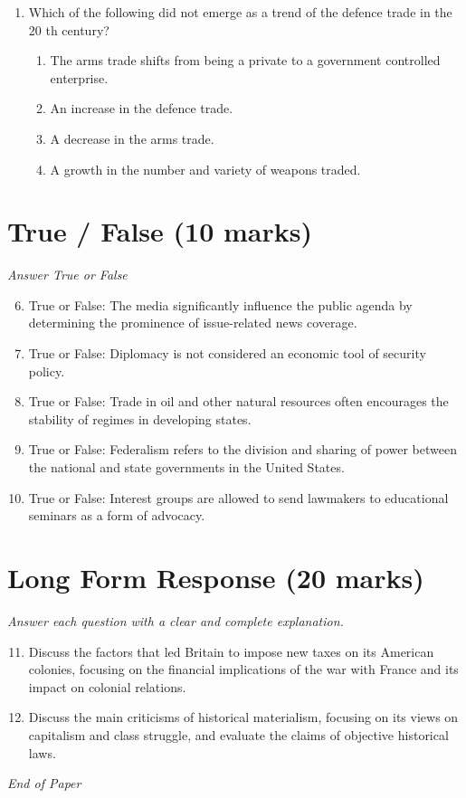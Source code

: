 \documentclass[12pt]{article}
\begin{document}
\begin{enumerate}[label=\arabic*.]
\begin{enumerate}[label=(\alph*)]
    \item the Bush Doctrine.
    \item the Monroe Doctrine.
\end{enumerate}
\item Which of the following did not emerge as a trend of the defence trade in the 20 th century?
\begin{enumerate}[label=(\alph*)]
    \item The arms trade shifts from being a private to a government controlled enterprise.
    \item An increase in the defence trade.
    \item A decrease in the arms trade.
    \item A growth in the number and variety of weapons traded.
\end{enumerate}
\end{enumerate}

\section*{True / False (10 marks)}
\textit{Answer True or False}
\begin{enumerate}[label=\arabic*.]
\setcounter{enumi}{5}
\item True or False: The media significantly influence the public agenda by determining the prominence of issue-related news coverage.
\item True or False: Diplomacy is not considered an economic tool of security policy.
\item True or False: Trade in oil and other natural resources often encourages the stability of regimes in developing states.
\item True or False: Federalism refers to the division and sharing of power between the national and state governments in the United States.
\item True or False: Interest groups are allowed to send lawmakers to educational seminars as a form of advocacy.
\end{enumerate}

\section*{Long Form Response (20 marks)}
\textit{Answer each question with a clear and complete explanation.}
\begin{enumerate}[label=\arabic*.]
\setcounter{enumi}{10}
\item Discuss the factors that led Britain to impose new taxes on its American colonies, focusing on the financial implications of the war with France and its impact on colonial relations.
\item Discuss the main criticisms of historical materialism, focusing on its views on capitalism and class struggle, and evaluate the claims of objective historical laws.
\end{enumerate}

\vfill
\noindent\textit{End of Paper}
\end{document}
